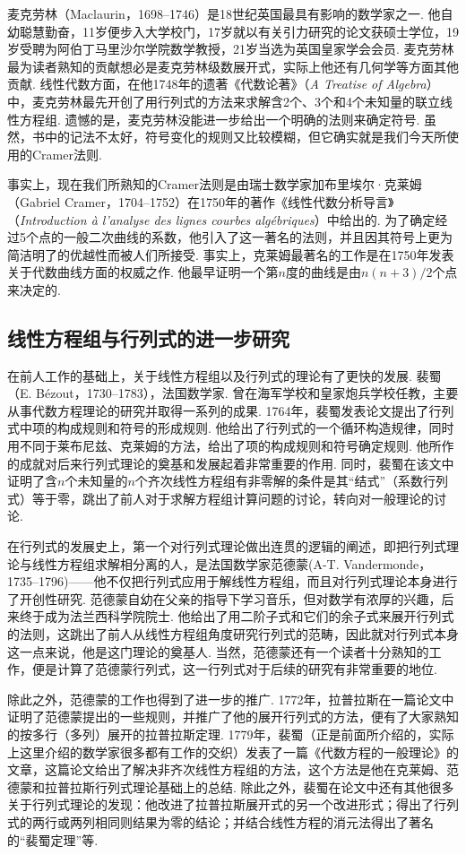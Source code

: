 麦克劳林（Maclaurin，1698--1746）是18世纪英国最具有影响的数学家之一. 他自幼聪慧勤奋，11岁便步入大学校门，17岁就以有关引力研究的论文获硕士学位，19岁受聘为阿伯丁马里沙尔学院数学教授，21岁当选为英国皇家学会会员. 麦克劳林最为读者熟知的贡献想必是麦克劳林级数展开式，实际上他还有几何学等方面其他贡献. 线性代数方面，在他1748年的遗著《代数论著》（\emph{A Treatise of Algebra}）中，麦克劳林最先开创了用行列式的方法来求解含2个、3个和4个未知量的联立线性方程组. 遗憾的是，麦克劳林没能进一步给出一个明确的法则来确定符号. 虽然，书中的记法不太好，符号变化的规则又比较模糊，但它确实就是我们今天所使用的Cramer法则.

事实上，现在我们所熟知的Cramer法则是由瑞士数学家加布里埃尔·克莱姆（Gabriel Cramer，1704--1752）在1750年的著作《线性代数分析导言》（\emph{Introduction à l'analyse des lignes courbes algébriques}）中给出的. 为了确定经过5个点的一般二次曲线的系数，他引入了这一著名的法则，并且因其符号上更为简洁明了的优越性而被人们所接受. 事实上，克莱姆最著名的工作是在1750年发表关于代数曲线方面的权威之作. 他最早证明一个第$n$度的曲线是由$n(n + 3)/2$个点来决定的.

\subsection{线性方程组与行列式的进一步研究}

在前人工作的基础上，关于线性方程组以及行列式的理论有了更快的发展. 裴蜀（E. Bézout，1730--1783），法国数学家. 曾在海军学校和皇家炮兵学校任教，主要从事代数方程理论的研究并取得一系列的成果. 1764年，裴蜀发表论文提出了行列式中项的构成规则和符号的形成规则. 他给出了行列式的一个循环构造规律，同时用不同于莱布尼兹、克莱姆的方法，给出了项的构成规则和符号确定规则. 他所作的成就对后来行列式理论的奠基和发展起着非常重要的作用. 同时，裴蜀在该文中证明了含$n$个未知量的$n$个齐次线性方程组有非零解的条件是其``结式''（系数行列式）等于零，跳出了前人对于求解方程组计算问题的讨论，转向对一般理论的讨论.

在行列式的发展史上，第一个对行列式理论做出连贯的逻辑的阐述，即把行列式理论与线性方程组求解相分离的人，是法国数学家范德蒙(A-T. Vandermonde，1735--1796)——他不仅把行列式应用于解线性方程组，而且对行列式理论本身进行了开创性研究. 范德蒙自幼在父亲的指导下学习音乐，但对数学有浓厚的兴趣，后来终于成为法兰西科学院院士. 他给出了用二阶子式和它们的余子式来展开行列式的法则，这跳出了前人从线性方程组角度研究行列式的范畴，因此就对行列式本身这一点来说，他是这门理论的奠基人. 当然，范德蒙还有一个读者十分熟知的工作，便是计算了范德蒙行列式，这一行列式对于后续的研究有非常重要的地位.

除此之外，范德蒙的工作也得到了进一步的推广. 1772年，拉普拉斯在一篇论文中证明了范德蒙提出的一些规则，并推广了他的展开行列式的方法，便有了大家熟知的按多行（多列）展开的拉普拉斯定理. 1779年，裴蜀（正是前面所介绍的，实际上这里介绍的数学家很多都有工作的交织）发表了一篇《代数方程的一般理论》的文章，这篇论文给出了解决非齐次线性方程组的方法，这个方法是他在克莱姆、范德蒙和拉普拉斯行列式理论基础上的总结. 除此之外，裴蜀在论文中还有其他很多关于行列式理论的发现：他改进了拉普拉斯展开式的另一个改进形式；得出了行列式的两行或两列相同则结果为零的结论；并结合线性方程的消元法得出了著名的``裴蜀定理''等.


